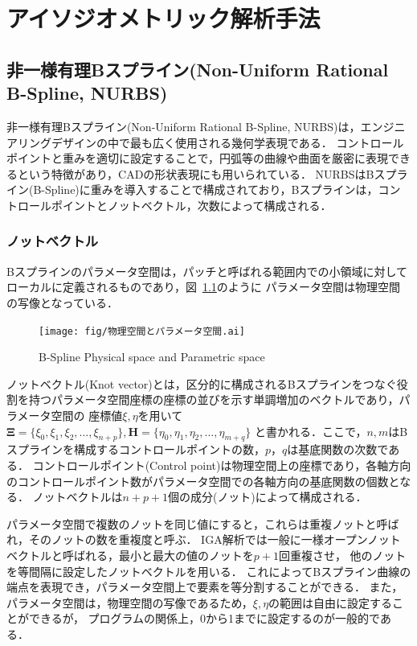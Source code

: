 \chapter{アイソジオメトリック解析手法}

\section{非一様有理Bスプライン(Non-Uniform Rational B-Spline, NURBS)}
非一様有理Bスプライン(Non-Uniform Rational B-Spline, NURBS)は，エンジニアリングデザインの中で最も広く使用される幾何学表現である．
コントロールポイントと重みを適切に設定することで，円弧等の曲線や曲面を厳密に表現できるという特徴があり，CADの形状表現にも用いられている．
NURBSはBスプライン(B-Spline)に重みを導入することで構成されており，Bスプラインは，コントロールポイントとノットベクトル，次数によって構成される．

\subsection{ノットベクトル}
Bスプラインのパラメータ空間は，パッチと呼ばれる範囲内での小領域に対してローカルに定義されるものであり，図~\ref{fig:parameter space}のように
パラメータ空間は物理空間の写像となっている．

\begin{figure}[htbp]
  \centering
  \texttt{[image: fig/物理空間とパラメータ空間.ai]}
  \caption{B-Spline Physical space and Parametric space}
  \label{fig:parameter space}
\end{figure}

ノットベクトル(Knot vector)とは，区分的に構成されるBスプラインをつなぐ役割を持つパラメータ空間座標の座標の並びを示す単調増加のベクトルであり，パラメータ空間の
座標値$\xi, \eta$を用いて$\boldsymbol{\Xi} = \{\xi_0, \xi_1, \xi_2, \dots, \xi_{n+p}\}, \boldsymbol{H} = \{\eta_0, \eta_1, \eta_2, \dots, \eta_{m+q}\}$
と書かれる．ここで，$n, m$はBスプラインを構成するコントロールポイントの数，$p，q$は基底関数の次数である．
コントロールポイント(Control point)は物理空間上の座標であり，各軸方向のコントロールポイント数がパラメータ空間での各軸方向の基底関数の個数となる．
ノットベクトルは$n + p + 1$個の成分(ノット)によって構成される．

パラメータ空間で複数のノットを同じ値にすると，これらは重複ノットと呼ばれ，そのノットの数を重複度と呼ぶ．
IGA解析では一般に一様オープンノットベクトルと呼ばれる，最小と最大の値のノットを$p + 1$回重複させ，
他のノットを等間隔に設定したノットベクトルを用いる．
これによってBスプライン曲線の端点を表現でき，パラメータ空間上で要素を等分割することができる．
また，パラメータ空間は，物理空間の写像であるため，$\xi, \eta$の範囲は自由に設定することができるが，
プログラムの関係上，0から1までに設定するのが一般的である．

